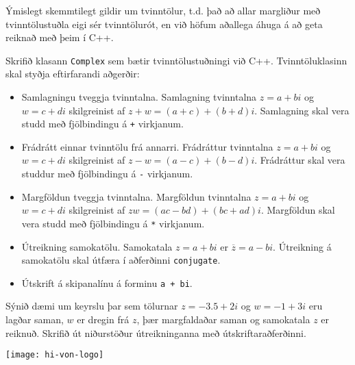 \documentclass{article}
\begin{document}
Ýmislegt skemmtilegt gildir um tvinntölur, t.d. það að allar margliður með tvinntölustuðla eigi sér tvinntölurót, en við höfum aðallega áhuga á að geta reiknað með þeim í C++.

Skrifið klasann \texttt{Complex} sem bætir tvinntölustuðningi við C++. Tvinntöluklasinn skal styðja eftirfarandi aðgerðir:

\begin{itemize}
 \item Samlagningu tveggja tvinntalna. Samlagning tvinntalna $z = a + bi$ og $w = c + di$ skilgreinist af $z + w = (a+c) + (b+d)i$. Samlagning skal vera studd með fjölbindingu á \texttt{+} virkjanum.
 \item Frádrátt einnar tvinntölu frá annarri. Frádráttur tvinntalna $z = a + bi$ og $w = c + di$ skilgreinist af $z - w = (a-c) + (b-d)i$. Frádráttur skal vera studdur með fjölbindingu á \texttt{-} virkjanum.
 \item Margföldun tveggja tvinntalna. Margföldun tvinntalna $z = a + bi$ og $w = c + di$ skilgreinist af $zw = (ac -bd) + (bc+ad)i$.
 Margföldun skal vera studd með fjölbindingu á \texttt{*} virkjanum.
 \item Útreikning samokatölu. Samokatala $z = a+bi$ er $\overline{z} = a-bi$. Útreikning á samokatölu skal útfæra í aðferðinni \texttt{conjugate}.
 \item Útskrift á skipanalínu á forminu \texttt{a + bi}.
\end{itemize}
Sýnið dæmi um keyrslu þar sem tölurnar $z = -3.5 + 2i$ og $w = -1+3i$ eru lagðar saman, $w$ er dregin frá $z$, þær margfaldaðar saman og samokatala $z$ er reiknuð. Skrifið út niðurstöður útreikninganna með útskriftaraðferðinni.

\vfill
\texttt{[image: hi-von-logo]}
\end{document}
